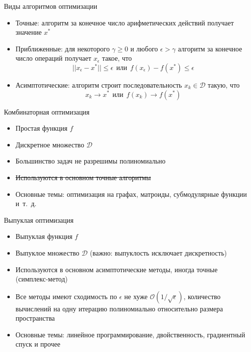 \documentclass[10pt]{beamer}
\begin{document}
\begin{frame}{Виды алгоритмов оптимизации}
\pause
\begin{itemize}[<+->]
\item Точные: алгоритм за конечное число арифметических действий получает значение $x^*$
\item Приближенные: для некоторого $\gamma\geq 0$ и любого $\epsilon>\gamma$ алгоритм за конечное число операций получает $x_\epsilon$ такое, что
$$
||x_\epsilon-x^*||\leq \epsilon~~\mbox{или}~~f(x_\epsilon)-f(x^*)\leq \epsilon
$$
\item Асимптотические: алгоритм строит последовательность $x_k\in \mathcal{D}$ такую, что
$$
x_k\rightarrow x^*~~\mbox{или}~~f(x_k)\rightarrow f(x^*)
$$

\end{itemize}
\end{frame}

\begin{frame}{Комбинаторная оптимизация}
\pause
\begin{itemize}[<+->]
\item Простая функция $f$
\item Дискретное множество $\mathcal{D}$
\item Большинство задач не разрешимы полиномиально
\item \sout{Используются в основном точные алгоритмы}
\item Основные темы: оптимизация на графах, матроиды, субмодулярные функции и~т.~д.
\end{itemize}

\end{frame}

\begin{frame}{Выпуклая оптимизация}
\pause
\begin{itemize}[<+->]
\item Выпуклая функция $f$
\item Выпуклое множество $\mathcal{D}$ (важно: выпуклость исключает дискретность)
\item Используются в основном асимптотические методы, иногда точные (симплекс-метод)
\item Все методы имеют сходимость по $\epsilon$ не хуже $\mathcal{O}(1/\sqrt{\epsilon})$, количество вычислений на одну итерацию полиномиально относительно размера пространства
\item Основные темы: линейное программирование, двойственность, градиентный спуск и прочее
\end{itemize}
\end{frame}
\end{document}
